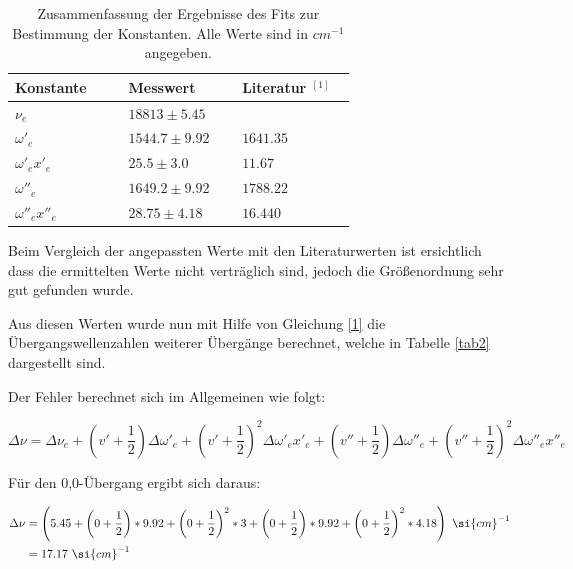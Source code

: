 \begin{table}[H]

 
 \caption{Zusammenfassung der Ergebnisse des Fits zur Bestimmung der Konstanten. Alle Werte sind in $\si{cm}^{-1}$ angegeben.}
\begin{tabular}{C{0.3\linewidth}|C{0.3\linewidth}C{0.3\linewidth}}

 
 Konstante &  Messwert &  Literatur $^{[1]}$\\
  \hline \addlinespace[1ex] 
$\nu_e$ & $18813 \pm 5.45$ & \\
$\omega'_e$ & $1544.7 \pm9.92$ & $1641.35$ \\
$\omega'_e x'_e$ & $25.5 \pm 3.0$ &  $11.67$ \\
$\omega''_e$ & $1649.2 \pm 9.92$ & $1788.22$ \\
$\omega''_e x''_e$ & $28.75 \pm 4.18$ & $16.440$ \\
 
   
 \end{tabular}
 \label{tab1}
 \end{table}


Beim Vergleich der angepassten Werte mit den Literaturwerten ist ersichtlich dass die ermittelten Werte nicht verträglich sind, jedoch die Größenordnung sehr gut gefunden wurde. 

Aus diesen Werten wurde nun mit Hilfe von Gleichung \ref{1} die Übergangswellenzahlen weiterer Übergänge berechnet, welche in Tabelle \ref{tab2} dargestellt sind.

Der Fehler berechnet sich im Allgemeinen wie folgt:

\begin {equation}
\Delta \nu=\Delta \nu_e+\left(v'+\frac{1}{2}\right)\Delta \omega'_e+\left(v'+\frac{1}{2}\right)^2\Delta \omega'_e x'_e+\left(v''+\frac{1}{2}\right)\Delta \omega''_e+\left(v''+\frac{1}{2}\right)^2\Delta \omega''_e x''_e
\end {equation}

Für den 0,0-Übergang ergibt sich daraus:

\begin {align}
\notag \Delta \nu&=\left(5.45+\left(0+\frac{1}{2}\right)*9.92+\left(0+\frac{1}{2}\right)^2*3+\left(0+\frac{1}{2}\right)*9.92+ \left(0+\frac{1}{2}\right)^2*4.18\right)~\si{cm}^{-1} \\ &=17.17~\si{cm}^{-1}
\end {align}



